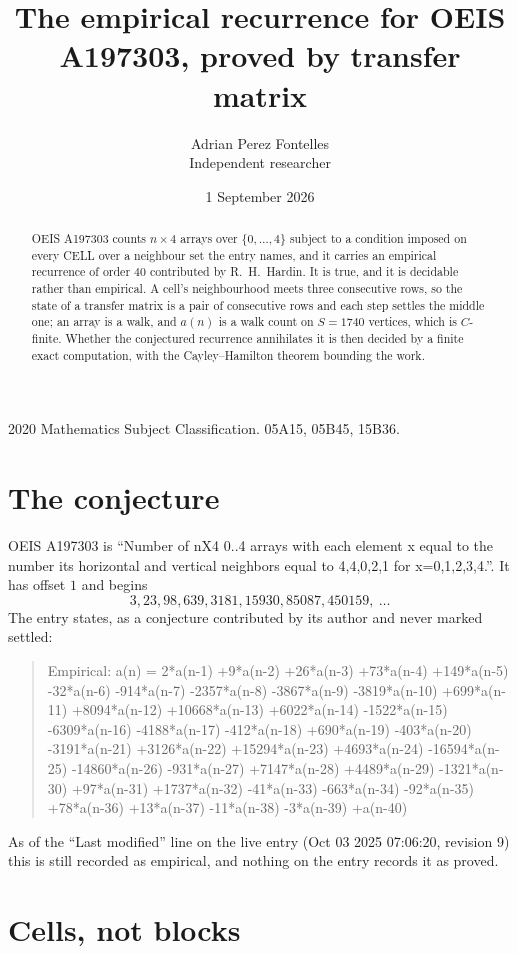 \documentclass[11pt,a4paper]{article}
\title{The empirical recurrence for OEIS A197303, proved by transfer matrix}
\author{Adrian Perez Fontelles\\ \small Independent researcher}
\date{1 September 2026}
\theoremstyle{plain}
\theoremstyle{definition}
\begin{document}
\maketitle

\begin{abstract}
OEIS A197303 counts $n\times4$ arrays over $\{0,\dots,4\}$ subject to a condition imposed on
every CELL over a neighbour set the entry names, and it carries an empirical recurrence of
order $40$ contributed by R.~H.~Hardin. It is true, and it is decidable rather than
empirical. A cell's neighbourhood meets three consecutive rows, so the state of a transfer
matrix is a pair of consecutive rows and each step settles the middle one; an array is a
walk, and $a(n)$ is a walk count on $S=1740$ vertices, which is $C$-finite. Whether the
conjectured recurrence annihilates it is then decided by a finite exact computation, with the
Cayley--Hamilton theorem bounding the work.
\end{abstract}

\noindent\small 2020 Mathematics Subject Classification. 05A15, 05B45, 15B36.\normalsize

\section{The conjecture}

OEIS A197303 is ``Number of nX4 0..4 arrays with each element x equal to the number its horizontal and vertical neighbors equal to 4,4,0,2,1 for x=0,1,2,3,4.''. It has offset $1$ and begins
\[
3, 23, 98, 639, 3181, 15930, 85087, 450159,\ \dots
\]
The entry states, as a conjecture contributed by its author and never marked settled:
\begin{quote}
Empirical: a(n) = 2*a(n-1) +9*a(n-2) +26*a(n-3) +73*a(n-4) +149*a(n-5) -32*a(n-6) -914*a(n-7) -2357*a(n-8) -3867*a(n-9) -3819*a(n-10) +699*a(n-11) +8094*a(n-12) +10668*a(n-13) +6022*a(n-14) -1522*a(n-15) -6309*a(n-16) -4188*a(n-17) -412*a(n-18) +690*a(n-19) -403*a(n-20) -3191*a(n-21) +3126*a(n-22) +15294*a(n-23) +4693*a(n-24) -16594*a(n-25) -14860*a(n-26) -931*a(n-27) +7147*a(n-28) +4489*a(n-29) -1321*a(n-30) +97*a(n-31) +1737*a(n-32) -41*a(n-33) -663*a(n-34) -92*a(n-35) +78*a(n-36) +13*a(n-37) -11*a(n-38) -3*a(n-39) +a(n-40)
\end{quote}
As of the ``Last modified'' line on the live entry (Oct 03 2025 07:06:20, revision 9) this is still
recorded as empirical, and nothing on the entry records it as proved.

\section{Cells, not blocks}
\end{document}
